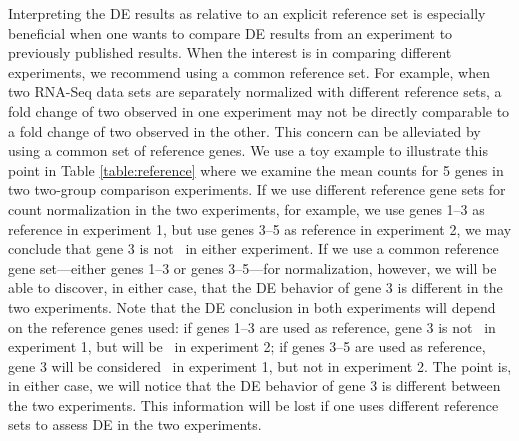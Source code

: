 			Interpreting the DE results as relative to an explicit reference set is
			especially beneficial when one wants to compare DE results from an experiment
			to previously published results.
			When the interest is in comparing different experiments, we recommend using a common 
			reference set. 
			For example, when two RNA-Seq data sets are separately
			normalized with different reference sets, a fold change of two observed in one
			experiment may not be directly comparable to a fold change of two observed in
			the other.  This concern can be alleviated by using a common set of reference
			genes.  We use a toy example to illustrate this point in Table
			\ref{table:reference} where we examine the mean counts for 5 genes in two
			two-group comparison experiments. If we use different reference gene sets for
			count normalization in the two experiments, for example, we use genes 1--3 as reference 
			in experiment
			1, but use genes 3--5 as reference in experiment 2, we may conclude that gene
			3 is not \DED~in either experiment. If we use a common reference gene
			set---either genes 1--3 or genes 3--5---for normalization, however, we will be
			able to discover, in either case, that the DE behavior of gene 3 is different
			in the two experiments. Note that the DE conclusion in both experiments will
			depend on the reference genes used: if genes 1--3 are used as reference, gene
			3 is not \DED~in experiment 1, but will be \DED~in experiment 2; if genes 3--5 are
			used as reference, gene 3 will be considered \DED~in experiment 1, but not in
			experiment 2. The point is, in either case, we will notice that the DE
			behavior of gene 3 is different between the two experiments. This information
			will be lost if one uses different reference sets to assess DE in the two
			experiments.
			
			
			
